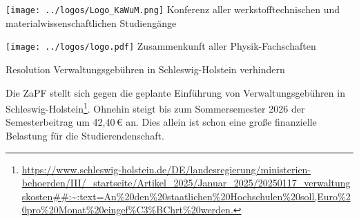 \documentclass[DIV=calc]{scrartcl}
\begin{document}
\hspace{0.55\textwidth}
\begin{minipage}{120pt}
	\vspace{-1.8cm}
	\texttt{[image: ../logos/Logo\_KaWuM.png]}
	\centering
	\small Konferenz aller werkstofftechnischen und materialwissenschaftlichen Studiengänge
\end{minipage}%
\begin{minipage}{120pt}
	\vspace{-1.8cm}
	\texttt{[image: ../logos/logo.pdf]}
	\centering
	\small Zusammenkunft aller Physik-Fachschaften
\end{minipage}

\begin{center}
  \huge{Resolution Verwaltungsgebühren in Schleswig-Holstein
verhindern}\vspace{.25\baselineskip}\\
  \normalsize
\end{center}
\vspace{1cm}






Die ZaPF stellt sich gegen die geplante Einführung von Verwaltungsgebühren in Schleswig-Holstein\footnote{\url{https://www.schleswig-holstein.de/DE/landesregierung/ministerien-behoerden/III/_startseite/Artikel_2025/Januar_2025/20250117_verwaltungskosten##:~:text=An\%20den\%20staatlichen\%20Hochschulen\%20soll,Euro\%20pro\%20Monat\%20eingef\%C3\%BChrt\%20werden.}}. Ohnehin steigt bis zum Sommersemester 2026 der Semesterbeitrag um 42,40\,€ an. Dies allein ist schon eine große finanzielle Belastung für die Studierendenschaft.
\end{document}
